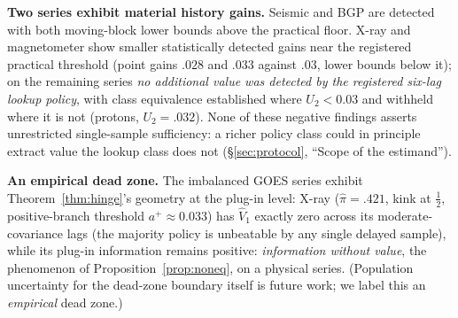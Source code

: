 \documentclass[acmsmall,screen,review,anonymous]{acmart}
\begin{document}
\textbf{Two series exhibit material history gains.} Seismic and BGP are
detected with both moving-block lower bounds above the practical floor. X-ray
and magnetometer show smaller statistically detected gains near the
registered practical threshold (point gains $.028$ and $.033$ against
$.03$, lower bounds below it); on the remaining series \emph{no
additional value was detected by the registered six-lag lookup policy},
with class equivalence established where $U_2<0.03$ and withheld
where it is not (protons, $U_2=.032$). None of these negative findings
asserts unrestricted single-sample sufficiency: a richer policy class
could in principle extract value the lookup class does not
(\S\ref{sec:protocol}, ``Scope of the estimand'').

\textbf{An empirical dead zone.} The imbalanced GOES series exhibit
Theorem~\ref{thm:hinge}'s geometry at the plug-in level: X-ray
($\hat\pi=.421$, kink at $\tfrac12$, positive-branch threshold
$a^+\approx0.033$) has $\widehat V_1$ exactly zero across its
moderate-covariance lags (the majority policy is unbeatable by any
single delayed sample), while its plug-in information remains positive:
\emph{information without value}, the phenomenon of
Proposition~\ref{prop:noneq}, on a physical series. (Population
uncertainty for the dead-zone boundary itself is future work; we label
this an \emph{empirical} dead zone.)
\end{document}
